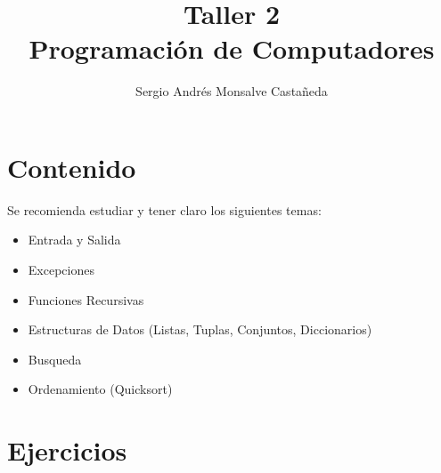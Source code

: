 \documentclass[11pt,twoside,a4paper]{article}
\title{
	Taller 2\\
 	Programación de Computadores
}
\author{Sergio Andrés Monsalve Castañeda}
\begin{document}
\maketitle

	\section{Contenido}
		Se recomienda estudiar y tener claro los siguientes temas: 
		\begin{itemize}
			\item Entrada y Salida
			\item Excepciones
			\item Funciones Recursivas
			\item Estructuras de Datos (Listas, Tuplas, Conjuntos, Diccionarios)
			\item Busqueda
			\item Ordenamiento (Quicksort)
		\end{itemize}

	\newpage
	\section{Ejercicios}
\end{document}
